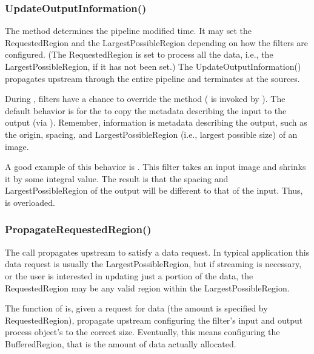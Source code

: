 \subsubsection{UpdateOutputInformation()}
\label{sec:UpdateOutputInformation}

The  method determines the pipeline modified
time. It may set the RequestedRegion and the LargestPossibleRegion depending
on how the filters are configured. (The RequestedRegion is set to process all
the data, i.e., the LargestPossibleRegion, if it has not been set.) The
UpdateOutputInformation() propagates upstream through the entire pipeline and
terminates at the sources.

During , filters have a chance to override the
 method
( is invoked by
). The default behavior is for the
 to copy the metadata describing the input
to the output (via ). Remember, information
is metadata describing the output, such as the origin, spacing,
and LargestPossibleRegion (i.e., largest possible size) of an image.

A good example of this behavior is . This filter
takes an input image and shrinks it by some integral value. The result is that
the spacing and LargestPossibleRegion of the output will be different to that
of the input. Thus,  is overloaded.

\subsubsection{PropagateRequestedRegion()}
\label{sec:PropagateRequestedRegion}

The  call propagates upstream to
satisfy a data request. In typical application this data request is usually the
LargestPossibleRegion, but if streaming is necessary, or the user is
interested in updating just a portion of the data, the RequestedRegion may be
any valid region within the LargestPossibleRegion.

The function of  is, given a request
for data (the amount is specified by RequestedRegion), propagate
upstream configuring the filter's input and output process object's to
the correct size. Eventually, this means configuring the
BufferedRegion, that is the amount of data actually allocated.

